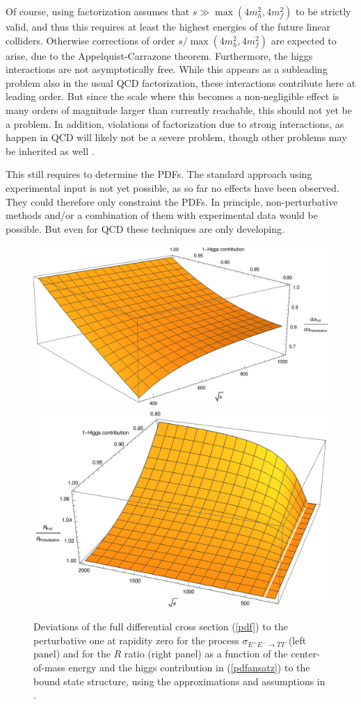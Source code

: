\documentclass[final,twoside,12pt]{article}
\newcommand*{\pref}[1]{(\ref{#1})}
\newcommand*{\1}{1\!\!\!\bot}
\begin{document}
Of course, using factorization assumes that $s\gg\max(4m_h^2,4m_f^2)$ to be strictly valid, and thus this requires at least the highest energies of the future linear colliders. Otherwise corrections of order $s/\max(4m_h^2,4m_f^2)$ are expected to arise, due to the Appelquist-Carrazone theorem. Furthermore, the higgs interactions are not asymptotically free. While this appears as a subleading problem also in the usual QCD factorization, these interactions contribute here at leading order. But since the scale where this becomes a non-negligible effect is many orders of magnitude larger than currently reachable, this should not yet be a problem. In addition, violations of factorization due to strong interactions, as happen in QCD \cite{Brodsky:2010an} will likely not be a severe problem, though other problems may be inherited as well \cite{Baumgart:2018ntv}.

This still requires to determine the PDFs. The standard approach using experimental input \cite{Gao:2017yyd} is not yet possible, as so far no effects have been observed. They could therefore only constraint the PDFs. In principle, non-perturbative methods \cite{Nguyen:2011jy,Lin:2014zya,Chen:2016utp,Lin:2017snn} and/or a combination of them with experimental data \cite{Nocera:2017war,Lin:2017snn} would be possible. But even for QCD these techniques are only developing.

\begin{figure}
\includegraphics[width=0.5\linewidth]{enhancement}\includegraphics[width=0.5\linewidth]{rratio-all}
\caption{\label{fig:pdf}Deviations of the full differential cross section \pref{pdf} to the perturbative one at rapidity zero for the process $\sigma_{E^+E^-\to\bar{T}T}$ (left panel) and for the $R$ ratio (right panel) as a function of the center-of-mass energy and the higgs contribution in \pref{pdfansatz} to the bound state structure, using the approximations and assumptions in \cite{Egger:2017tkd,Maas:2017swq}.}
\end{figure}
\end{document}
